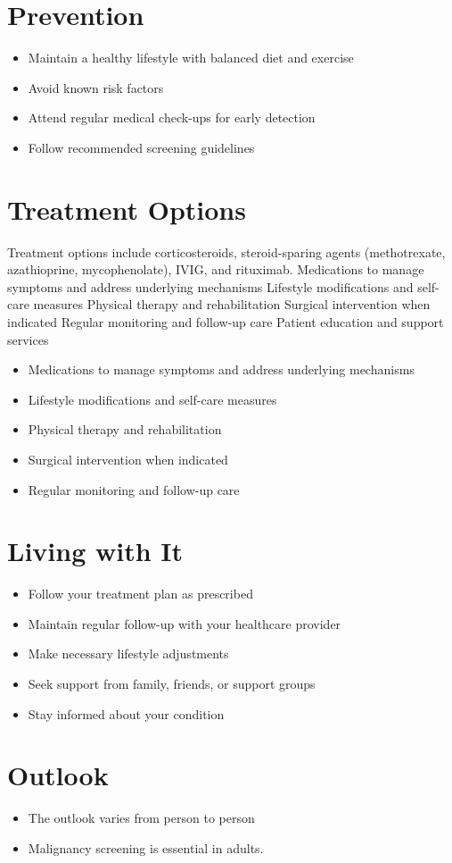 \section{Prevention}
\begin{itemize}[noitemsep]
  \item Maintain a healthy lifestyle with balanced diet and exercise
  \item Avoid known risk factors
  \item Attend regular medical check-ups for early detection
  \item Follow recommended screening guidelines
\end{itemize}
\section{Treatment Options}
Treatment options include corticosteroids, steroid-sparing agents (methotrexate, azathioprine, mycophenolate), IVIG, and rituximab. Medications to manage symptoms and address underlying mechanisms Lifestyle modifications and self-care measures Physical therapy and rehabilitation Surgical intervention when indicated Regular monitoring and follow-up care Patient education and support services

\begin{itemize}[noitemsep]
  \item Medications to manage symptoms and address underlying mechanisms
  \item Lifestyle modifications and self-care measures
  \item Physical therapy and rehabilitation
  \item Surgical intervention when indicated
  \item Regular monitoring and follow-up care
\end{itemize}
\section{Living with It}
\begin{itemize}[noitemsep]
  \item Follow your treatment plan as prescribed
  \item Maintain regular follow-up with your healthcare provider
  \item Make necessary lifestyle adjustments
  \item Seek support from family, friends, or support groups
  \item Stay informed about your condition
\end{itemize}
\section{Outlook}
\begin{itemize}[noitemsep]
  \item The outlook varies from person to person
  \item Malignancy screening is essential in adults.
\end{itemize}
